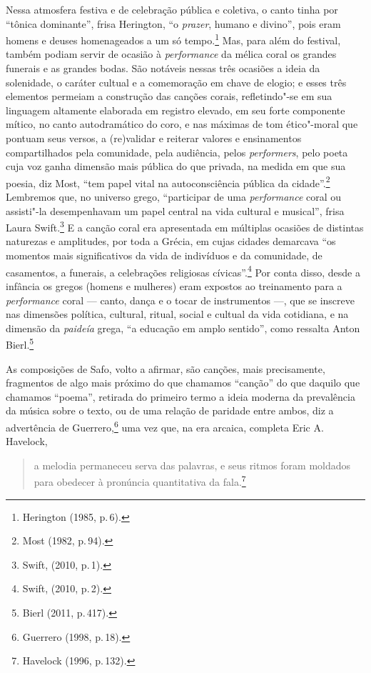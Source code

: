 Nessa atmosfera festiva e de celebração pública e coletiva, o canto tinha por
“tônica dominante”, frisa Herington, “o \emph{prazer}, humano e
divino”, pois eram homens e deuses homenageados a um só tempo.\footnote{ Herington (1985, p.\,6).} Mas, para além
do festival, também podiam servir de ocasião à
\emph{performance} da mélica coral os grandes funerais e as grandes bodas.
São notáveis nessas três ocasiões a ideia da
solenidade, o caráter cultual e a comemoração em chave de elogio; e esses
três elementos permeiam a construção das canções corais, refletindo"-se
em sua linguagem altamente elaborada em registro elevado, em seu forte
componente mítico, no canto autodramático do coro, e nas máximas de tom
ético"-moral que pontuam seus versos, a (re)validar e reiterar valores e
ensinamentos compartilhados pela comunidade, pela audiência, pelos
\emph{performers}, pelo poeta cuja voz ganha dimensão mais
pública do que privada, na medida em que sua poesia, diz Most,
“tem papel vital na autoconsciência pública da cidade”.\footnote{Most (1982, p.\,94).}
Lembremos que, no universo grego, “participar de uma \emph{performance} coral ou assisti"-la desempenhavam um papel central na vida cultural e musical”, frisa Laura Swift.\footnote{Swift, (2010, p.\,1).} E a canção coral era apresentada em múltiplas ocasiões de distintas naturezas e amplitudes, por toda a Grécia, em cujas cidades demarcava “os momentos mais significativos da vida de indivíduos e da comunidade, de casamentos, a funerais, a celebrações religiosas cívicas”.\footnote{Swift, (2010, p.\,2).} Por conta disso, desde a infância os gregos (homens e mulheres) eram expostos ao treinamento para a \emph{performance} coral --- canto, dança e o tocar de instrumentos ---, que se inscreve nas dimensões política, cultural, ritual, social e cultual da vida cotidiana, e na dimensão da \emph{paideía} grega, “a educação em amplo sentido”, como ressalta Anton Bierl.\footnote{Bierl (2011, p.\,417).}

As composições de Safo, volto a afirmar, são canções, mais
precisamente, fragmentos de algo mais próximo do que chamamos “canção” do que
daquilo que chamamos “poema”, retirada do primeiro termo a ideia moderna da
prevalência da música sobre o texto, ou de uma relação de paridade entre ambos,
diz a advertência de Guerrero,\footnote{ Guerrero (1998, p.\,18).} uma vez que, na era arcaica,
completa Eric A. Havelock, 

\begin{quote}
a melodia permaneceu serva
das palavras, e seus ritmos foram moldados para obedecer à pronúncia
quantitativa da fala.\footnote{ Havelock (1996, p.\,132).}
\end{quote}

